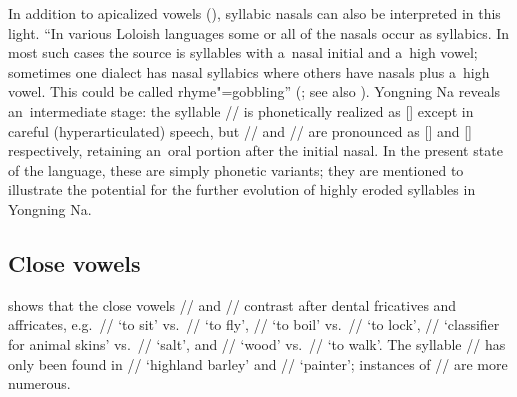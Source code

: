 		In addition to apicalized vowels (), syllabic nasals can
		also be interpreted in this light. “In various Loloish languages some or all of the nasals occur as
		syllabics. In most such cases the  source is syllables with a~nasal initial and a~high
		vowel; sometimes one dialect has nasal syllabics where others have nasals plus a~high vowel. This
		could be called rhyme"=gobbling” (\citealt[150]{bradley1989}; see also
		\citealt[8]{bjorverud1998}). Yongning Na reveals an~intermediate stage: the syllable // is
		phonetically realized as [] except in careful (hyperarticulated) speech, but //
		and // are pronounced as [] and [] respectively, retaining an~oral portion
		after the initial nasal. 
		In the
		present state of the language, these are simply phonetic variants; they are mentioned to illustrate
		the potential for the further evolution of highly eroded syllables in Yongning Na.
				

		\subsection{Close vowels}
		\label{sec:closevowels}
		
		 shows that the close vowels // and // 
		contrast after dental fricatives and affricates,
		e.g.~// ‘to sit’ vs.\ // ‘to fly’, // ‘to boil’ vs.\ // ‘to
		lock’, // ‘classifier for animal skins’ vs.\ // ‘salt’, and // ‘wood’
		vs.\ // ‘to walk’. The syllable // has only been found in // ‘highland
		barley’ and // ‘painter’; instances of // are more numerous. 
		
